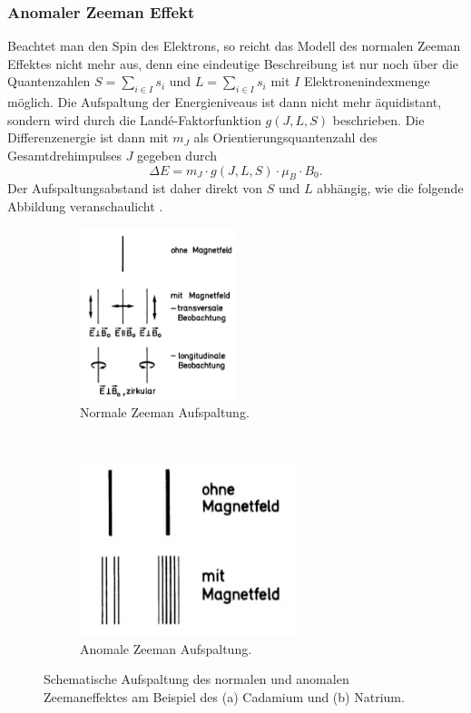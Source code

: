 \subsubsection*{Anomaler Zeeman Effekt}
	Beachtet man den Spin des Elektrons, so reicht das Modell des normalen Zeeman Effektes nicht mehr aus, denn eine eindeutige Beschreibung ist nur noch über die Quantenzahlen $S = \sum_{i\in I}s_i$ und $L = \sum_{i\in I}s_i$ mit $I$ Elektronenindexmenge möglich. Die Aufspaltung der Energieniveaus ist dann nicht mehr äquidistant, sondern wird durch die Landé-Faktorfunktion $g(J,L,S)$ beschrieben. Die Differenzenergie ist dann mit $m_J$ als Orientierungsquantenzahl des Gesamtdrehimpulses $J$ gegeben durch
	\[
		\Delta E = m_J\cdot g(J,L,S)\cdot\mu_B\cdot B_0.
	\]
	Der Aufspaltungsabstand ist daher direkt von $S$ und $L$ abhängig, wie die folgende Abbildung veranschaulicht \cite[p.219]{HakenWolf}.
	\begin{figure}[H]
		\centering
		\begin{subfigure}[b]{0.4\textwidth}
			\centering
			\includegraphics[height=5cm]{Bilddateien/Grundlagen/NormalZeemanAufspaltung.png}
			\caption{Normale Zeeman Aufspaltung.}
			\label{fig:NormalZeemanAufspaltung}
		\end{subfigure}
		\
		\begin{subfigure}[b]{0.4\textwidth}
			\centering
			\includegraphics[height=5cm]{Bilddateien/Grundlagen/AnomalZeemanAufspaltung.png}
			\caption{Anomale Zeeman Aufspaltung.}
			\label{fig:AnomaleZeemanAufspaltung}
		\end{subfigure}
		\caption{Schematische Aufspaltung des normalen und anomalen Zeemaneffektes am Beispiel des (a) Cadamium und (b) Natrium.}
	\end{figure}
